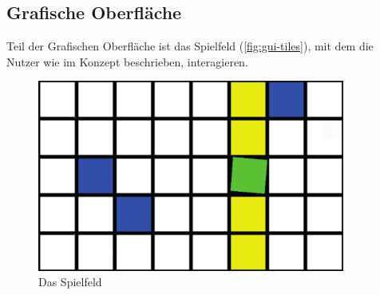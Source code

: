 \subsection{Grafische Oberfläche}

Teil der Grafischen Oberfläche ist das Spielfeld (\autoref{fig:gui-tiles}), mit dem die Nutzer wie im Konzept beschrieben, interagieren.

\begin{figure}[htbp] 
  \centering
     \includegraphics[width=0.9\textwidth]{images/gui-tiles}
  \caption{Das Spielfeld}
  \label{fig:gui-tiles}
\end{figure}
